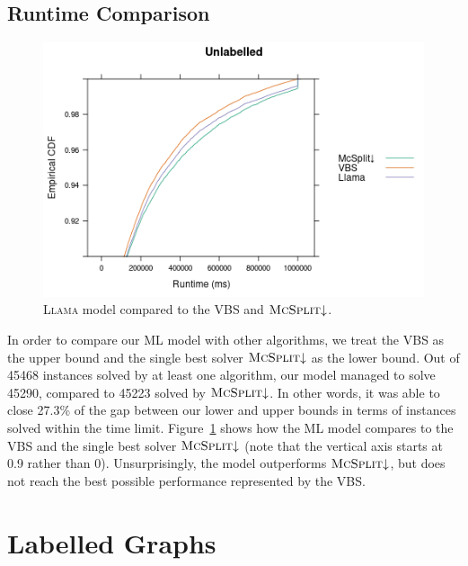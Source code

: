 \documentclass{l4proj}
\theoremstyle{definition}
\theoremstyle{remark}
\begin{document}
\subsection{Runtime Comparison}

\begin{figure}
  \centering
  \includegraphics[scale=0.5]{images/ecdf_unlabelled_llama.png}
  \caption{\textsc{Llama} model compared to the VBS and
    $\textsc{McSplit}{\downarrow}$.}
  \label{fig:ecdf_unlabelled_llama}
\end{figure}

In order to compare our ML model with other algorithms, we treat the VBS as the
upper bound and the single best solver $\textsc{McSplit}{\downarrow}$ as the
lower bound. Out of \num{45468} instances solved by at least one algorithm, our
model managed to solve \num{45290}, compared to \num{45223} solved by
$\textsc{McSplit}{\downarrow}$. In other words, it was able to close 27.3\% of
the gap between our lower and upper bounds in terms of instances solved within
the time limit. Figure~\ref{fig:ecdf_unlabelled_llama} shows how the ML model
compares to the VBS and the single best solver $\textsc{McSplit}{\downarrow}$
(note that the vertical axis starts at 0.9 rather than 0). Unsurprisingly, the
model outperforms $\textsc{McSplit}{\downarrow}$, but does not reach the best
possible performance represented by the VBS.

\section{Labelled Graphs} \label{sec:ml_labelled}
\end{document}
